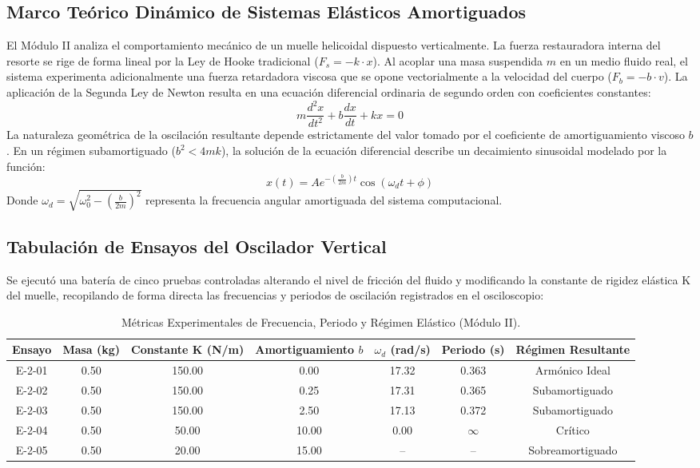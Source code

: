 \documentclass[11pt,a4paper]{article}
\begin{document}
	\subsection{Marco Teórico Dinámico de Sistemas Elásticos Amortiguados}
	El Módulo II analiza el comportamiento mecánico de un muelle helicoidal dispuesto verticalmente. La fuerza restauradora interna del resorte se rige de forma lineal por la Ley de Hooke tradicional ($F_s = -k \cdot x$). Al acoplar una masa suspendida $m$ en un medio fluido real, el sistema experimenta adicionalmente una fuerza retardadora viscosa que se opone vectorialmente a la velocidad del cuerpo ($F_b = -b \cdot v$). La aplicación de la Segunda Ley de Newton resulta en una ecuación diferencial ordinaria de segundo orden con coeficientes constantes:
	\begin{equation}
		m \frac{d^2x}{dt^2} + b \frac{dx}{dt} + kx = 0
	\end{equation}
	La naturaleza geométrica de la oscilación resultante depende estrictamente del valor tomado por el coeficiente de amortiguamiento viscoso $b$. En un régimen subamortiguado ($b^2 < 4mk$), la solución de la ecuación diferencial describe un decaimiento sinusoidal modelado por la función:
	\begin{equation}
		x(t) = A e^{-\left(\frac{b}{2m}\right)t} \cos(\omega_d t + \phi)
	\end{equation}
	Donde $\omega_d = \sqrt{\omega_0^2 - (\frac{b}{2m})^2}$ representa la frecuencia angular amortiguada del sistema computacional.
	
	\subsection{Tabulación de Ensayos del Oscilador Vertical}
	Se ejecutó una batería de cinco pruebas controladas alterando el nivel de fricción del fluido y modificando la constante de rigidez elástica K del muelle, recopilando de forma directa las frecuencias y periodos de oscilación registrados en el osciloscopio:
	
	\begin{table}[htbp]
		\centering
		\caption{Métricas Experimentales de Frecuencia, Periodo y Régimen Elástico (Módulo II).}
		\begin{tabular}{ccccccc}
			\toprule
			\textbf{Ensayo} & \textbf{Masa (kg)} & \textbf{Constante K (N/m)} & \textbf{Amortiguamiento $b$} & $\omega_d$ \textbf{(rad/s)} & \textbf{Periodo (s)} & \textbf{Régimen Resultante} \\
			\midrule
			E-2-01 & 0.50 & 150.00 & 0.00 & 17.32 & 0.363 & Armónico Ideal \\
			E-2-02 & 0.50 & 150.00 & 0.25 & 17.31 & 0.365 & Subamortiguado \\
			E-2-03 & 0.50 & 150.00 & 2.50 & 17.13 & 0.372 & Subamortiguado \\
			E-2-04 & 0.50 & 50.00 & 10.00 & 0.00 & $\infty$ & Crítico \\
			E-2-05 & 0.50 & 20.00 & 15.00 & -- & -- & Sobreamortiguado \\
			\bottomrule
		\end{tabular}
		\label{tab:datos_resorte}
	\end{table}
	
\end{document}
